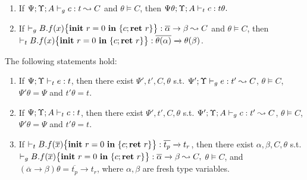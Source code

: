 {{{\begin{lemma}
{\begin{enumerate}[label={(\alph*)}]
\item\label{lem:cgrsound-2} If $\Psi;\Upsilon; A \vdash_{g} c : t\leadsto C$ and $\theta \vDash C$,
then  $\Psi\theta;\Upsilon;A \vdash_{t} c : t\theta.$

\item\label{lem:cgrsound-3} If $ \vdash_{g} {B.f}(x)\big\{{{\textbf{init}~ {r}=0 ~\textbf{in}~\{{c};\textbf{ret}~{r}\}}}\big\} :  \overline{\alpha}\rightarrow \beta\leadsto C$ and $\theta \vDash C$, then
$
\vdash_{t} {B.f}(x)\big\{{{\textbf{init}~ {r}=0 ~\textbf{in}~\{{c};\textbf{ret}~{r}\}}}\big\} : \overline{\theta(\alpha)}\xrightarrow{}\theta(\beta)
$.

\end{enumerate}
}
\end{lemma}



\begin{lemma}\label{lem:cgrcomplete}
The following statements hold:
{\myeqsize
\begin{enumerate}[label={(\alph*)}]

\item\label{lem:cgrcomplete-1} If $\Psi;\Upsilon \vdash_{t} e : t$, then there exist $\Psi',t',C,\theta$ s.t. $\Psi';\Upsilon \vdash_{g} e : t' \leadsto C$,  $\theta \vDash C$, $\Psi'\theta =\Psi$ and $t'\theta = t$.
\item\label{lem:cgrcomplete-2} If $\Psi;\Upsilon; A \vdash_{t} c : t$, then there exist $\Psi',t',C,\theta$ s.t. $\Psi';\Upsilon; A \vdash_{g} c : t' \leadsto C$,  $\theta \vDash C$, $\Psi'\theta =\Psi$ and $t'\theta = t$.
\item\label{lem:cgrcomplete-3} If $\vdash_{t} {B.f}(\overline{x})\big\{{{\textbf{init}~ {r}=0 ~\textbf{in}~\{{c};\textbf{ret}~{r}\}}}\big\} : \overline{t_p}\xrightarrow{} t_r$, then there exist $\alpha,\beta,C,\theta$ s.t.
$
\vdash_{g} {B.f}(\overline{x})\big\{{{\textbf{init}~ {r}=0 ~\textbf{in}~\{{c};\textbf{ret}~{r}\}}}\big\}: \overline{\alpha}\xrightarrow{} \beta \leadsto C,
$
$\theta \vDash C$, and $(\overline{\alpha}\xrightarrow{} \beta)\theta = \overline{t_p}\xrightarrow{} t_r$, where $\alpha,\beta$ are fresh type variables.
\end{enumerate}}
\end{lemma}


}}}
